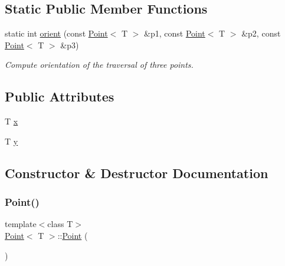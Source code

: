 \subsection*{Static Public Member Functions}
\begin{DoxyCompactItemize}
\item 
static int \mbox{\hyperlink{classPoint_a33e4f445ed5dfc1a5f8cca8177c1a9c5}{orient}} (const \mbox{\hyperlink{classPoint}{Point}}$<$ T $>$ \&p1, const \mbox{\hyperlink{classPoint}{Point}}$<$ T $>$ \&p2, const \mbox{\hyperlink{classPoint}{Point}}$<$ T $>$ \&p3)
\begin{DoxyCompactList}\small\item\em Compute orientation of the traversal of three points. \end{DoxyCompactList}\end{DoxyCompactItemize}
\subsection*{Public Attributes}
\begin{DoxyCompactItemize}
\item 
T \mbox{\hyperlink{classPoint_a401d07562afaf0079121218025e66b76}{x}}
\item 
T \mbox{\hyperlink{classPoint_a65146418a33ebb2cd9acb85cade60ac9}{y}}
\end{DoxyCompactItemize}


\subsection{Constructor \& Destructor Documentation}
\mbox{\label{classPoint_aea76b1130f1a203722d8f2254ced8e66}} 
\subsubsection{\texorpdfstring{Point()}{Point()}\hspace{0.1cm}{\footnotesize\ttfamily [1/2]}}
{\footnotesize\ttfamily template$<$class T$>$ \\
\mbox{\hyperlink{classPoint}{Point}}$<$ T $>$\+::\mbox{\hyperlink{classPoint}{Point}} (\begin{DoxyParamCaption}{ }\end{DoxyParamCaption})\hspace{0.3cm}{\ttfamily [inline]}}


\begin{DoxyCode}{0}

\end{DoxyCode}
\mbox{\label{classPoint_a6583d71c9cddfe6e079135c724ea228c}} 
